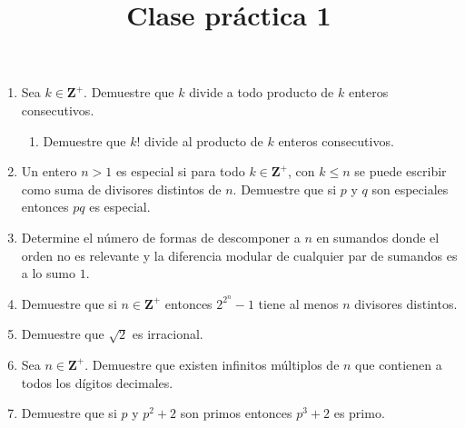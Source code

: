 \documentclass{article}
\begin{document}
\title{Clase pr\'actica 1}
\maketitle

\begin{enumerate}
    \item Sea $k \in \mathbf{Z^+}$. Demuestre que $k$ divide a todo producto de $k$ enteros consecutivos. 
    \begin{enumerate}
        \item Demuestre que $k!$ divide al producto de $k$ enteros consecutivos.
    \end{enumerate}
    \item Un entero $n>1$ es especial si para todo $k \in \mathbf{Z^+}$, con $k \leq n$ se puede escribir como suma de divisores distintos de $n$. Demuestre que si $p$ y $q$ son especiales entonces $pq$ es especial.
    \item Determine el n\'umero de formas de descomponer a $n$ en sumandos donde el orden no es relevante y la diferencia modular de cualquier par de sumandos es a lo sumo $1$.
    \item Demuestre que si $n \in \mathbf{Z^+}$ entonces $2^{2^n} - 1$ tiene al menos $n$ divisores distintos.
    \item Demuestre que $\sqrt{2}$ es irracional.
    \item Sea  $n \in \mathbf{Z^+}$. Demuestre que existen infinitos m\'ultiplos de $n$ que contienen a todos los d\'igitos decimales.
    \item Demuestre que si $p$ y $p^2+2$ son primos entonces $p^3+2$ es primo.
\end{enumerate}
\end{document}
